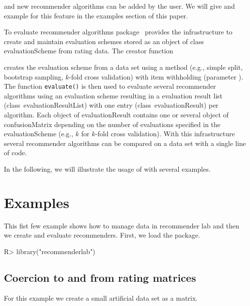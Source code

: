 \documentclass[nojss]{jss}
\newcommand{\class}[1]{\mbox{\textsf{#1}}}
\newcommand{\func}[1]{\mbox{\texttt{#1()}}}
\begin{document}
and new recommender algorithms can be added by the user. 
We will give and example for this feature 
in the examples section of this paper.

To evaluate recommender algorithms package~
provides the infrastructure to create and maintain evaluation schemes 
stored as an object of class \class{evaluationScheme} from rating data. 
The creator function 

\begin{center}
\end{center}

creates the evaluation scheme from a data set using a method
(e.g., simple split, bootstrap sampling, $k$-fold cross validation)
with item withholding (parameter ). 
The function \func{evaluate} is then used to
evaluate several recommender algorithms using an evaluation scheme resulting
in a evaluation result list (class~\class{evaluationResultList}) with
one entry (class~\class{evaluationResult}) per algorithm. 
Each object of \class{evaluationResult} 
contains one or several object of \class{confusionMatrix} depending on the 
number of evaluations specified in the \class{evaluationScheme} (e.g., $k$
for $k$-fold cross validation).
With this infrastructure several recommender algorithms can be compared
on a data set with a single line of code.

In the following, we will illustrate the usage of 
with several examples.
\section{Examples}
\label{sec:examples}
This fist few example shows how to manage data in recommender lab and then 
we create and evaluate recommenders.
First, we load the package.

\begin{Schunk}
\begin{Sinput}
R> library("recommenderlab")
\end{Sinput}
\end{Schunk}

\subsection{Coercion to and from rating matrices}

For this example we create a small 
artificial data set as a matrix. 
\end{document}
